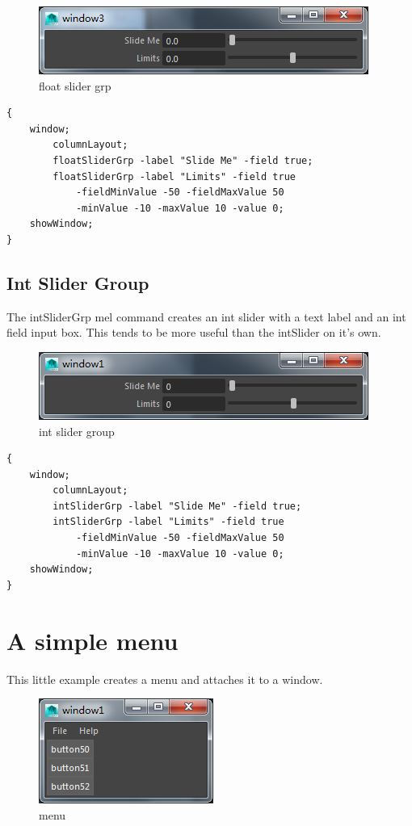 \begin{figure}[tbh]
	\centering
	\includegraphics[width=0.3\linewidth]{figures/GUI/floatSliderGrp}
	\caption{float slider grp}
	\label{fig:floatslidergrp}
\end{figure}

\begin{lstlisting}
{
	window;
		columnLayout;
		floatSliderGrp -label "Slide Me" -field true;
		floatSliderGrp -label "Limits" -field true
			-fieldMinValue -50 -fieldMaxValue 50
			-minValue -10 -maxValue 10 -value 0;
	showWindow;
}
\end{lstlisting}

\subsection{Int Slider Group}
The intSliderGrp mel command creates an int slider with a text label and an int field input box. This tends to be more useful than the intSlider on it's own.

\begin{figure}[tbh]
	\centering
	\includegraphics[width=0.3\linewidth]{figures/GUI/intSliderGrp}
	\caption{int slider group}
	\label{fig:intslidergrp}
\end{figure}

\begin{lstlisting}
{
	window;
		columnLayout;
		intSliderGrp -label "Slide Me" -field true;
		intSliderGrp -label "Limits" -field true
			-fieldMinValue -50 -fieldMaxValue 50
			-minValue -10 -maxValue 10 -value 0;
	showWindow;
}
\end{lstlisting}

\section{A simple menu}
This little example creates a menu and attaches it to a window.

\begin{figure}[tbh]
	\centering
	\includegraphics[width=0.2\linewidth]{figures/GUI/menu}
	\caption{menu}
	\label{fig:menu}
\end{figure}

